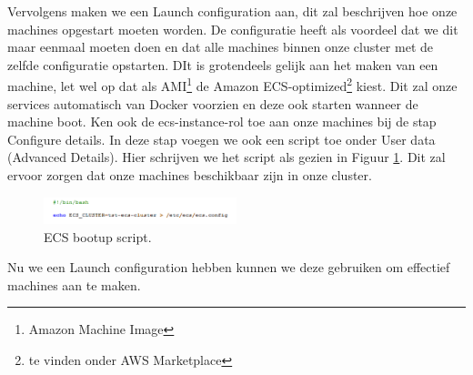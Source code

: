 \documentclass{article}
\begin{document}
	\par
	Vervolgens maken we een Launch configuration aan, dit zal beschrijven hoe onze machines opgestart moeten worden. De configuratie heeft als voordeel dat we dit maar eenmaal moeten doen en dat alle machines binnen onze cluster met de zelfde configuratie opstarten. DIt is grotendeels gelijk aan het maken van een machine, let wel op dat als AMI\footnote{Amazon Machine Image} de Amazon ECS-optimized\footnote{te vinden onder AWS Marketplace} kiest. Dit zal onze services automatisch van Docker voorzien en deze ook starten wanneer de machine boot. Ken ook de ecs-instance-rol toe aan onze machines bij de stap Configure details. In deze stap voegen we ook een script toe onder User data (Advanced Details). Hier schrijven we het script als gezien in Figuur \ref{fig:ecs-script}. Dit zal ervoor zorgen dat onze machines beschikbaar zijn in onze cluster.
	\begin{figure}[h!]
		\centering
  		\includegraphics[width=0.5\textwidth]{images/ecs-script.PNG}
  		\caption{ECS bootup script.}
  		\label{fig:ecs-script}
	\end{figure}
	\par
	Nu we een Launch configuration hebben kunnen we deze gebruiken om effectief machines aan te maken.
\end{document}
